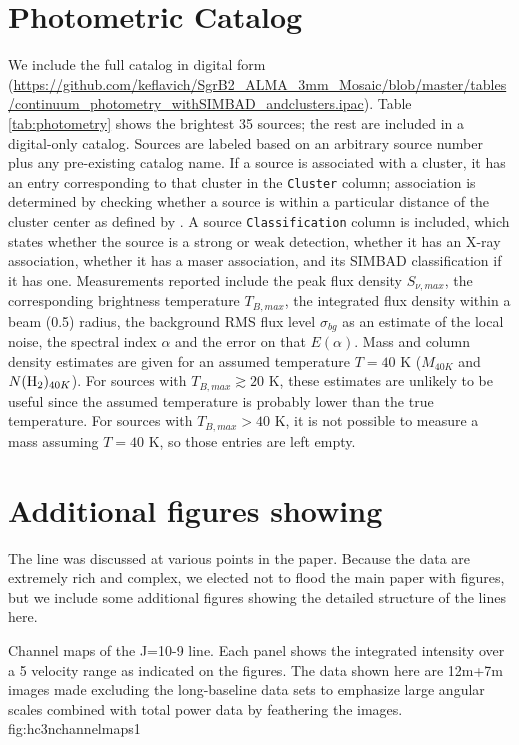 \documentclass[twocolumn]{aastex61}
\begin{document}
\section{Photometric Catalog}
We include the full catalog in digital form
(\url{https://github.com/keflavich/SgrB2_ALMA_3mm_Mosaic/blob/master/tables/continuum_photometry_withSIMBAD_andclusters.ipac}).
Table \ref{tab:photometry} shows
the brightest 35 sources; the rest are included in a digital-only catalog.
Sources are labeled based on an arbitrary source
number plus any pre-existing catalog name.  If a source is associated with a cluster,
it has an entry corresponding to that cluster in the \texttt{Cluster} column;
association is determined by checking whether a source is within a particular distance
of the cluster center as defined by \citet{Schmiedeke2016a}.  A source
\texttt{Classification} column is included, which states whether the source
is a strong or weak detection, whether it has an X-ray association, whether it
has a maser association, and its SIMBAD classification if it has one.
Measurements reported include the peak flux density $S_{\nu,max}$, the
corresponding brightness temperature $T_{B,max}$, the integrated flux density
within a beam (0.5\arcsec) radius, the background RMS flux level $\sigma_{bg}$
as an estimate of the local noise, the spectral index $\alpha$ and the error on
that $E(\alpha)$.  Mass and column density estimates are given for an assumed
temperature $T=40$ K ($M_{40K}$ and $N(\textrm{H}_{2})_{40K}$).  For sources with
$T_{B,max}\gtrsim20$ K, these estimates are unlikely to be useful since the
assumed temperature is probably lower than the true temperature.
For sources with $T_{B,max}>40$ K, it is not possible to measure a mass
assuming $T=40$ K, so those entries are left empty.



\section{Additional figures showing \cyanoacetylene}
The \cyanoacetylene line was discussed at various points in the paper.  Because
the data are extremely rich and complex, we elected not to flood the main paper
with figures, but we include some additional figures showing the detailed
structure of the lines here.

{Channel maps of the \cyanoacetylene J=10-9 line.  Each panel shows the integrated
intensity over a 5 \kms velocity range as indicated on the figures.
The data shown here are 
12m+7m images made excluding the long-baseline data sets to emphasize
large angular scales
combined with total power
data by feathering the images.}
{fig:hc3nchannelmaps}{1}{\textwidth}
\end{document}
